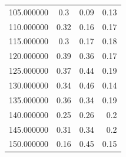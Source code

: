 \documentclass[a4paper,11pt]{report}
\begin{document}
\begin{figure}
\begin{tabular}{|l|c|c|r|}
105.000000&	0.3&	0.09&	0.13\\
110.000000&	0.32&	0.16&	0.17\\
115.000000&	0.3&	0.17&	0.18\\
120.000000&	0.39&	0.36&	0.17\\
125.000000&	0.37&	0.44&	0.19\\
130.000000&	0.34&	0.46&	0.14\\
135.000000&	0.36&	0.34&	0.19\\
140.000000&	0.25&	0.26&	0.2\\
145.000000&	0.31&	0.34&	0.2\\
150.000000&	0.16&	0.45&	0.15\\

\hline


\hline
\end{tabular}
\end{figure}
\end{document}
